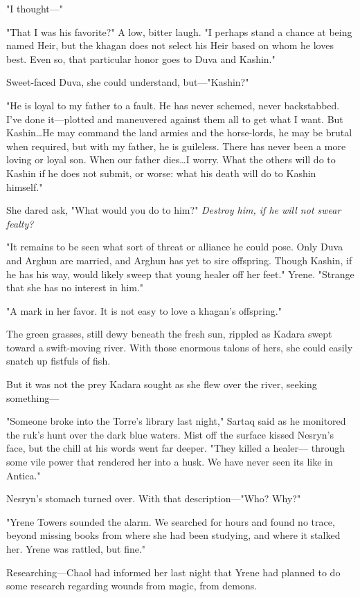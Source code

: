 "I thought---"

"That I was his favorite?"
A low, bitter laugh.
"I perhaps stand a chance at being named Heir, but the khagan does not select his Heir based on whom he loves best.
Even so, that particular honor goes to Duva and Kashin."

Sweet-faced Duva, she could understand, but---"Kashin?"

"He is loyal to my father to a fault.
He has never schemed, never backstabbed.
I've done it---plotted and maneuvered against them all to get what I want.
But Kashin\ldots He may command the land armies and the horse-lords, he may be brutal when required, but with my father, he is guileless.
There has never been a more loving or loyal son.
When our father dies\ldots I worry.
What the others will do to Kashin if he does not submit, or worse: what his death will do to Kashin himself."

She dared ask, "What would you do to him?"
\emph{Destroy him, if he will not swear fealty?}

"It remains to be seen what sort of threat or alliance he could pose.
Only Duva and Arghun are married, and Arghun has yet to sire offspring.
Though Kashin, if he has his way, would likely sweep that young healer off her feet."
Yrene.
"Strange that she has no interest in him."

"A mark in her favor.
It is not easy to love a khagan's offspring."

The green grasses, still dewy beneath the fresh sun, rippled as Kadara swept toward a swift-moving river.
With those enormous talons of hers, she could easily snatch up fistfuls of fish.

But it was not the prey Kadara sought as she flew over the river, seeking something---

"Someone broke into the Torre's library last night," Sartaq said as he monitored the ruk's hunt over the dark blue waters.
Mist off the surface kissed Nesryn's face, but the chill at his words went far deeper.
"They killed a healer--- through some vile power that rendered her into a husk.
We have never seen its like in Antica."

Nesryn's stomach turned over.
With that description---"Who?
Why?"

"Yrene Towers sounded the alarm.
We searched for hours and found no trace, beyond missing books from where she had been studying, and where it stalked her.
Yrene was rattled, but fine."

Researching---Chaol had informed her last night that Yrene had planned to do some research regarding wounds from magic, from demons.

